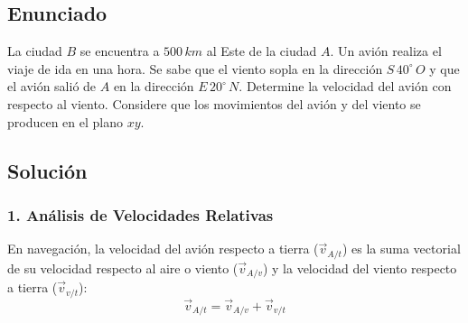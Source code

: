 \documentclass[12pt, a4paper]{article}
\begin{document}
\newpage

\subsection*{Enunciado}

La ciudad $B$ se encuentra a $500 \, \si{km}$ al Este de la ciudad $A$. Un avión realiza el viaje de ida en una hora. Se sabe que el viento sopla en la dirección $S \, 40^\circ \, O$ y que el avión salió de $A$ en la dirección $E \, 20^\circ \, N$. Determine la velocidad del avión con respecto al viento. Considere que los movimientos del avión y del viento se producen en el plano $xy$.

\begin{center}
\end{center}

\subsection*{Solución}

\subsubsection*{1. Análisis de Velocidades Relativas}
En navegación, la velocidad del avión respecto a tierra ($\vec{v}_{A/t}$) es la suma vectorial de su velocidad respecto al aire o viento ($\vec{v}_{A/v}$) y la velocidad del viento respecto a tierra ($\vec{v}_{v/t}$):
\begin{equation}
    \vec{v}_{A/t} = \vec{v}_{A/v} + \vec{v}_{v/t}
\end{equation}
\end{document}

